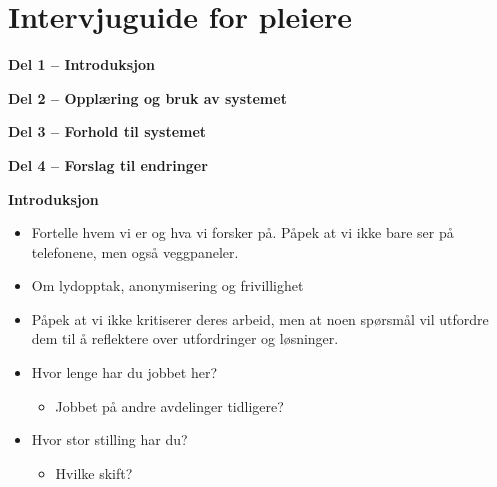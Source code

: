 \chapter{Intervjuguide for pleiere}
\label{chp:appendix_intervjuguide_pleiere}

\textbf{Del 1 – Introduksjon}

\noindent
\textbf{Del 2 – Opplæring og bruk av systemet}

\noindent
\textbf{Del 3 – Forhold til systemet}

\noindent
\textbf{Del 4 – Forslag til endringer}
 
\noindent
\textbf{Introduksjon}
\begin{itemize}
    \item Fortelle hvem vi er og hva vi forsker på. Påpek at vi ikke bare ser på telefonene, men også veggpaneler.
    \item Om lydopptak, anonymisering og frivillighet
    \item Påpek at vi ikke kritiserer deres arbeid, men at noen spørsmål vil utfordre dem til å reflektere over utfordringer og løsninger.
\end{itemize}

\begin{itemize}
	\item Hvor lenge har du jobbet her?
    \begin{itemize}
		\item Jobbet på andre avdelinger tidligere?
 	\end{itemize}
 	\item Hvor stor stilling har du?
    \begin{itemize}
		\item Hvilke skift?
	\end{itemize}
\end{itemize}

